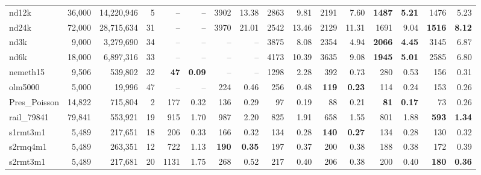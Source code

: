 \begin{landscape}
\begin{table}
\begin{tabular}{lrrr||rr|rr|rr|rr|rr|rr}
	               nd12k	&	36,000	&	14,220,946	&	5  &      --  &      --   &     3902 &    13.38  &     2863 &     9.81  &     2191 &     7.60  & \textbf{    1487} & \textbf{    5.21}  &     1476 &     5.23\\
	               nd24k	&	72,000	&	28,715,634	&	31  &      --  &      --   &     3970 &    21.01  &     2542 &    13.46  &     2129 &    11.31  &     1691 &     9.04  & \textbf{    1516} & \textbf{    8.12}\\
	                nd3k	&	9,000	&	3,279,690	&	34  &      --  &      --   &      --  &      --   &     3875 &     8.08  &     2354 &     4.94  & \textbf{    2066} & \textbf{    4.45}  &     3145 &     6.87\\
	                nd6k	&	18,000	&	6,897,316	&	33  &      --  &      --   &      --  &      --   &     4173 &    10.39  &     3635 &     9.08  & \textbf{    1945} & \textbf{    5.01}  &     2585 &     6.80\\
	            nemeth15	&	9,506	&	539,802	&	32  & \textbf{      47} & \textbf{    0.09}  &      --  &      --   &     1298 &     2.28  &      392 &     0.73  &      280 &     0.53  &      156 &     0.31\\
	             olm5000	&	5,000	&	19,996	&	47  &      --  &      --   &      224 &     0.46  &      256 &     0.48  & \textbf{     119} & \textbf{    0.23}  &      114 &     0.24  &      153 &     0.26\\
	        Pres\_Poisson	&	14,822	&	715,804	&	2  &      177 &     0.32  &      136 &     0.29  &       97 &     0.19  &       88 &     0.21  & \textbf{      81} & \textbf{    0.17}  &       73 &     0.26\\
	          rail\_79841	&	79,841	&	553,921	&	19  &      915 &     1.70  &      987 &     2.20  &      825 &     1.91  &      658 &     1.55  &      801 &     1.88  & \textbf{     593} & \textbf{    1.34}\\
	            s1rmt3m1	&	5,489	&	217,651	&	18  &      206 &     0.33  &      166 &     0.32  &      134 &     0.28  & \textbf{     140} & \textbf{    0.27}  &      134 &     0.28  &      130 &     0.32\\
	            s2rmq4m1	&	5,489	&	263,351	&	12  &      722 &     1.13  & \textbf{     190} & \textbf{    0.35}  &      197 &     0.37  &      200 &     0.38  &      188 &     0.38  &      172 &     0.39\\
	            s2rmt3m1	&	5,489	&	217,681	&	20  &     1131 &     1.75  &      268 &     0.52  &      217 &     0.40  &      206 &     0.38  &      200 &     0.40  & \textbf{     180} & \textbf{    0.36}\\

\end{tabular}
\end{table}
\end{landscape}
